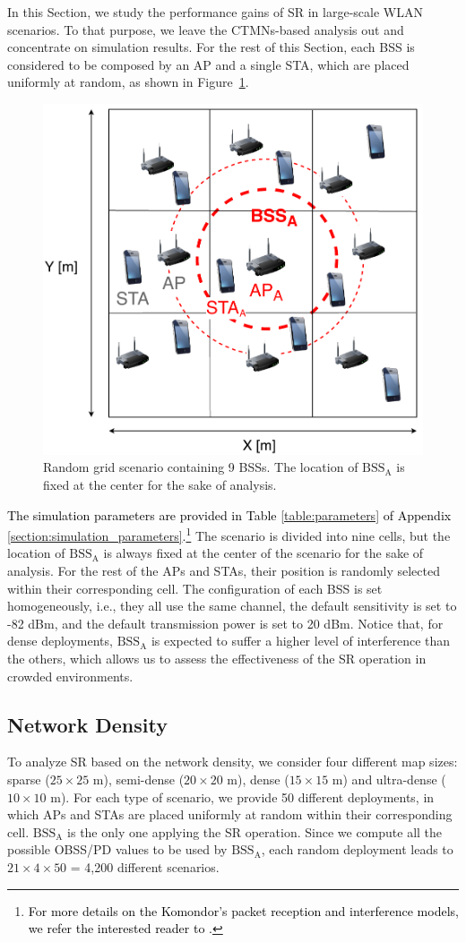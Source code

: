 \documentclass[preprint,12pt]{elsarticle}
\theoremstyle{plain}
\begin{document}
In this Section, we study the performance gains of SR in large-scale WLAN scenarios. To that purpose, we leave the CTMNs-based analysis out and concentrate on simulation results. For the rest of this Section, each BSS is considered to be composed by an AP and a single STA, which are placed uniformly at random, as shown in Figure~\ref{fig:random_scenario}. 

\begin{figure}[ht!]
	\centering
	\includegraphics[width=0.4\columnwidth]{random_scenario}
	\caption{Random grid scenario containing 9 BSSs. The location of $\text{BSS}_\text{A}$ is fixed at the center for the sake of analysis.}
	\label{fig:random_scenario}
\end{figure}

\textcolor{black}{The simulation parameters are provided in Table \ref{table:parameters} of Appendix \ref{section:simulation_parameters}.}\footnote{\textcolor{black}{For more details on the Komondor's packet reception and interference models, we refer the interested reader to \cite{barrachina2019komondor}.}} The scenario is divided into nine cells, but the location of $\text{BSS}_\text{A}$ is always fixed at the center of the scenario for the sake of analysis. For the rest of the APs and STAs, their position is randomly selected within their corresponding cell. The configuration of each BSS is set homogeneously, i.e., they all use the same channel, the default sensitivity is set to -82 dBm, and the default transmission power is set to 20 dBm. Notice that, for dense deployments, $\text{BSS}_\text{A}$ is expected to suffer a higher level of interference than the others, which allows us to assess the effectiveness of the SR operation in crowded environments.

\subsection{Network Density}
\label{section:random_scenarios_density}
To analyze SR based on the network density, we consider four different map sizes: sparse ($25\times25$ m), semi-dense ($20\times20$ m), dense ($15\times15$ m) and ultra-dense ($10\times10$ m). For each type of scenario, we provide 50 different deployments, in which APs and STAs are placed uniformly at random within their corresponding cell. $\text{BSS}_\text{A}$ is the only one applying the SR operation. Since we compute all the possible OBSS/PD values to be used by $\text{BSS}_\text{A}$, each random deployment leads to $21\times4\times50$ = 4,200 different scenarios.
\end{document}

